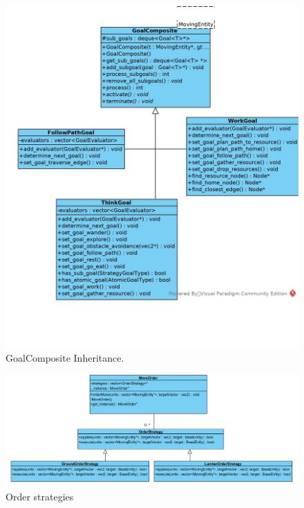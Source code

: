\begin{figure}[!htb]
    \centering
    \includegraphics{res/GoalComposite-Inherit.jpg}
    \caption{GoalComposite Inheritance.}\label{fig:goalcomposite-inherit}
\end{figure}

\begin{figure}[!htb]
    \centering
    \includegraphics[angle=-90,origin=c,scale=0.65]
    {images/order-strategies.PNG}
    \caption{Order strategies}\label{fig:orderstrategies}
\end{figure}

